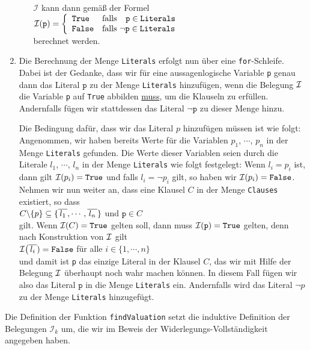 \begin{enumerate}
\begin{enumerate}
            $\mathcal{I}$ kann dann gemäß der Formel  
            \\[0.2cm]
            \hspace*{1.3cm}
            $\mathcal{I}(\texttt{p}) = \left\{
             \begin{array}{ll}
               \texttt{True}  & \mbox{falls $\hspace*{0.25cm}\texttt{p} \in \texttt{Literals}$} \\
               \texttt{False} & \mbox{falls $\neg\texttt{p} \in \texttt{Literals}$}
             \end{array}\right.
            $
            \\[0.2cm]
            berechnet werden.
      \end{enumerate}
\item Die Berechnung der Menge \texttt{Literals} erfolgt nun über eine \texttt{for}-Schleife.
      Dabei ist der Gedanke, dass wir für eine aussagenlogische Variable \texttt{p} genau dann das Literal
      $\texttt{p}$ zu der Menge \texttt{Literals} hinzufügen, wenn die Belegung $\mathcal{I}$ die Variable \texttt{p}
      auf \texttt{True} abbilden \underline{muss}, um die Klauseln zu erfüllen.  Andernfalls fügen wir
      stattdessen das Literal $\neg\texttt{p}$ zu dieser Menge hinzu.

      Die Bedingung dafür, dass wir das Literal $p$ hinzufügen müssen ist wie folgt:
      Angenommen, wir haben bereits Werte für die Variablen
      $p_1$, $\cdots$, $p_n$ in der Menge \texttt{Literals}  gefunden.
      Die Werte dieser Variablen seien durch die Literale $l_1$, $\cdots$, $l_n$ in der Menge \texttt{Literals}
      wie folgt festgelegt: Wenn $l_i = p_i$ ist, dann gilt $\mathcal{I}(p_i) = \texttt{True}$ 
      und falls $l_i = \neg p_i$ gilt, so haben wir $\mathcal{I}(p_i) = \texttt{False}$.
      Nehmen wir nun weiter an, dass eine Klausel $C$ in der Menge \texttt{Clauses} existiert, so dass
      \\[0.2cm]
      \hspace*{1.3cm}
      $C \backslash \{p\} \subseteq \{ \overline{\,l_1\,}, \cdots, \overline{\,l_n\,} \}$ \quad und \quad $\texttt{p} \in C$
      \\[0.2cm]
      gilt.  Wenn $\mathcal{I}(C) = \texttt{True}$ gelten soll, dann muss $\mathcal{I}(\texttt{p}) = \texttt{True}$ gelten, denn
      nach Konstruktion von $\mathcal{I}$ gilt 
      \\[0.2cm]
      \hspace*{1.3cm}
      $\mathcal{I}\bigl(\overline{\,l_i\,}) = \texttt{False}$ \quad für alle $i \in \{1,\cdots,n\}$
      \\[0.2cm]
      und damit ist \texttt{p} das einzige Literal in der Klausel $C$, das wir mit Hilfe der Belegung $\mathcal{I}$
      überhaupt noch wahr machen können.  In diesem Fall fügen wir also das Literal
      $\texttt{p}$ in die Menge \texttt{Literals} ein.  Andernfalls wird das Literal $\neg p$ zu der Menge
      \texttt{Literals} hinzugefügt.
\end{enumerate}
Die Definition der Funktion \texttt{findValuation} setzt die induktive Definition der Belegungen
$\mathcal{I}_k$ um, die wir im Beweis der Widerlegungs-Vollständigkeit angegeben haben.

